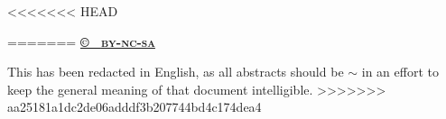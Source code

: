 <<<<<<< HEAD
\par{}
=======
\foreignlanguage{english}{\href{https://creativecommons.org/licenses/by-nc-sa/4.0/}{\textbf{©~ \textsc{by-nc-sa}}}}\par\foreignlanguage{english}{This has been redacted in English, as all abstracts should be $\sim$ in an effort to keep the general meaning of that document intelligible.}
>>>>>>> aa25181a1dc2de06adddf3b207744bd4c174dea4
